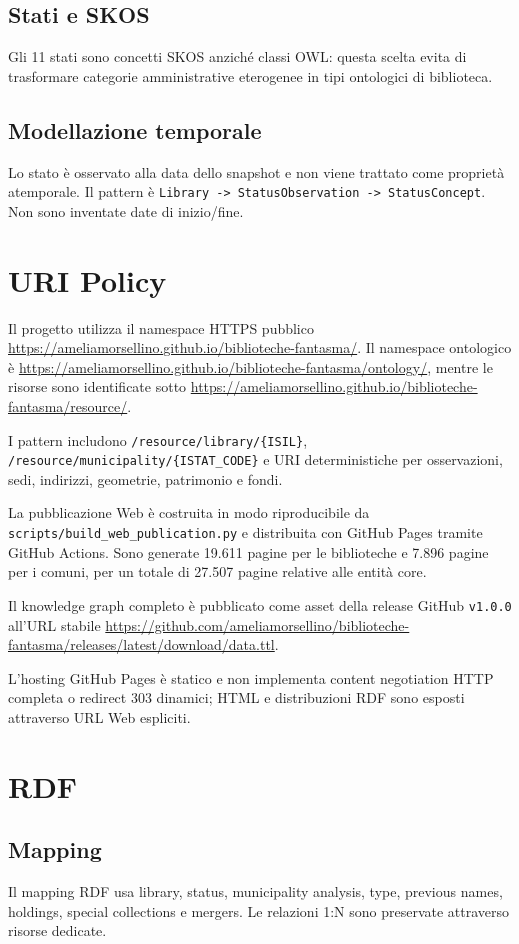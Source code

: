 \documentclass[11pt,a4paper]{article}
\begin{document}
\subsection{Stati e SKOS}
Gli 11 stati sono concetti SKOS anziché classi OWL: questa scelta evita di trasformare categorie amministrative eterogenee in tipi ontologici di biblioteca.

\subsection{Modellazione temporale}
Lo stato è osservato alla data dello snapshot e non viene trattato come proprietà atemporale. Il pattern è \texttt{Library -> StatusObservation -> StatusConcept}. Non sono inventate date di inizio/fine.

\section{URI Policy}
Il progetto utilizza il namespace HTTPS pubblico
\url{https://ameliamorsellino.github.io/biblioteche-fantasma/}.
Il namespace ontologico è
\url{https://ameliamorsellino.github.io/biblioteche-fantasma/ontology/},
mentre le risorse sono identificate sotto
\url{https://ameliamorsellino.github.io/biblioteche-fantasma/resource/}.

I pattern includono
\texttt{/resource/library/\{ISIL\}},
\texttt{/resource/municipality/\{ISTAT\_CODE\}} e URI deterministiche
per osservazioni, sedi, indirizzi, geometrie, patrimonio e fondi.

La pubblicazione Web è costruita in modo riproducibile da
\texttt{scripts/build\_web\_publication.py} e distribuita con GitHub Pages
tramite GitHub Actions. Sono generate 19.611 pagine per le biblioteche e
7.896 pagine per i comuni, per un totale di 27.507 pagine relative alle
entità core.

Il knowledge graph completo è pubblicato come asset della release GitHub
\texttt{v1.0.0} all'URL stabile
\url{https://github.com/ameliamorsellino/biblioteche-fantasma/releases/latest/download/data.ttl}.

L'hosting GitHub Pages è statico e non implementa content negotiation HTTP
completa o redirect 303 dinamici; HTML e distribuzioni RDF sono esposti
attraverso URL Web espliciti.

\section{RDF}
\subsection{Mapping}
Il mapping RDF usa library, status, municipality analysis, type, previous names, holdings, special collections e mergers. Le relazioni 1:N sono preservate attraverso risorse dedicate.
\end{document}

